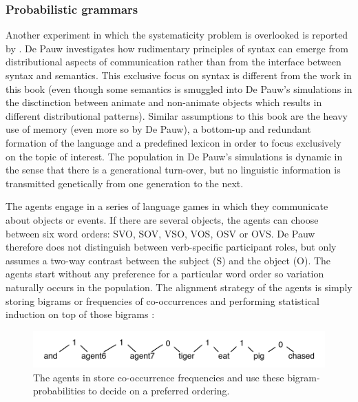 \subsubsection{Probabilistic grammars}
 Another experiment in which the systematicity problem is overlooked is reported by \citet[chapter 10]{depauw02grael}. De Pauw investigates how rudimentary principles of syntax can emerge from distributional aspects of communication rather than from the interface between syntax and semantics. This exclusive focus on syntax is different from the work in this book (even though some semantics is smuggled into De Pauw's simulations in the disctinction between animate and non-animate objects which results in different distributional patterns). Similar assumptions to this book are the heavy use of memory (even more so by De Pauw), a bottom-up and redundant formation of the language and a predefined lexicon in order to focus exclusively on the topic of interest. The population in De Pauw's simulations is dynamic in the sense that there is a generational turn-over, but no linguistic information is transmitted genetically from one generation to the next.

The agents engage in a series of language games in which they communicate about objects or events. If there are several objects, the agents can choose between six word orders: SVO, SOV, VSO, VOS, OSV or OVS. De Pauw therefore does not distinguish between verb-specific participant roles, but only assumes a two-way contrast between the subject (S) and the object (O). The agents start without any preference for a particular word order so variation naturally occurs in the population. The alignment strategy of the agents is simply storing bigrams or frequencies of co-occurrences and performing statistical induction on top of those bigrams \citep[362]{depauw02grael}:

\begin{figure}[h]
\centerline{\includegraphics[width=\textwidth]{Chapter4/figs/depauw}}
  \caption[Bigram probabilities \citep{depauw02grael}]{The agents in \citet{depauw02grael} store co-occurrence frequencies and use these bigram-probabilities to decide on a preferred ordering.}
   \label{f:depauw}
\end{figure}

